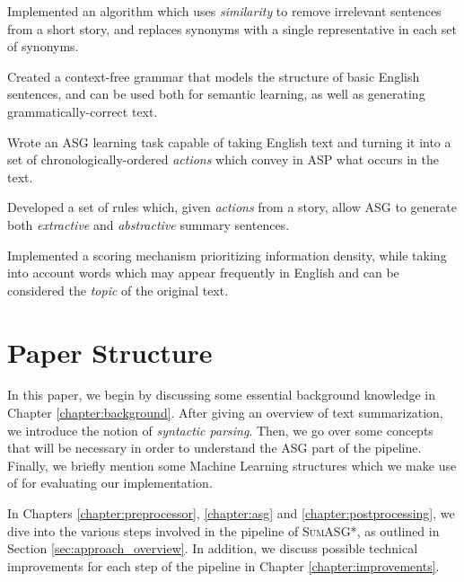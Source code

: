\begin{contribution}
Implemented an algorithm which uses \textit{similarity} to remove irrelevant sentences from a short story, and replaces synonyms with a single representative in each set of synonyms.
\end{contribution}

\begin{contribution}
Created a context-free grammar that models the structure of basic English sentences, and can be used both for semantic learning, as well as generating grammatically-correct text.
\end{contribution}

\begin{contribution}
Wrote an ASG learning task capable of taking English text and turning it into a set of chronologically-ordered \textit{actions} which convey in ASP what occurs in the text.
\end{contribution}

\begin{contribution}
Developed a set of rules which, given \textit{actions} from a story, allow ASG to generate both \textit{extractive} and \textit{abstractive} summary sentences.
\end{contribution}

\begin{contribution}
Implemented a scoring mechanism prioritizing information density, while taking into account words which may appear frequently in English and can be considered the \textit{topic} of the original text.
\end{contribution}

\section{Paper Structure}

In this paper, we begin by discussing some essential background knowledge in Chapter \ref{chapter:background}. After giving an overview of text summarization, we introduce the notion of \textit{syntactic parsing}. Then, we go over some concepts that will be necessary in order to understand the ASG part of the pipeline. Finally, we briefly mention some Machine Learning structures which we make use of for evaluating our implementation.

In Chapters \ref{chapter:preprocessor}, \ref{chapter:asg} and \ref{chapter:postprocessing}, we dive into the various steps involved in the pipeline of \textsc{SumASG*}, as outlined in Section \ref{sec:approach_overview}. In addition, we discuss possible technical improvements for each step of the pipeline in Chapter \ref{chapter:improvements}.

